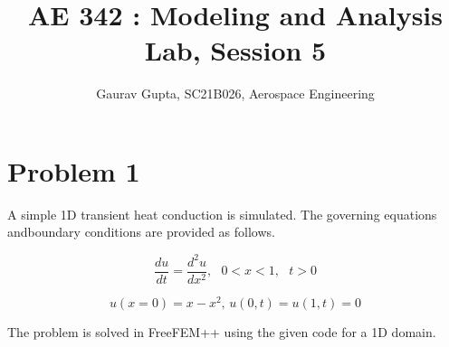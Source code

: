 \documentclass[11pt]{article} %
\title{AE 342 : Modeling and Analysis Lab, Session 5}
\author{Gaurav Gupta, SC21B026, Aerospace Engineering}
\begin{document}
\maketitle

\section{Problem 1}
A simple 1D transient heat conduction is simulated. The governing equations andboundary conditions are provided as follows.


\begin{equation}
\frac{du}{dt} = \frac{d^2u}{dx^2}, \text{ }0 < x < 1, \text{ }t>0
\end{equation}

\begin{equation}
u(x=0) = x-x^2 \text{,  } u(0,t) = u(1,t)=0 
\end{equation}

The problem is solved in FreeFEM++ using the given code for a 1D domain. 
\end{document}

